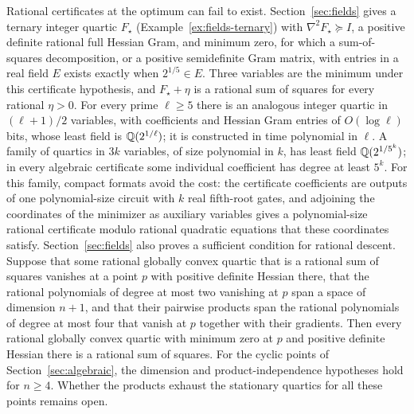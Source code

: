 Rational certificates at the optimum can fail to exist.
Section~\ref{sec:fields} gives a ternary integer quartic $F_\star$
(Example~\ref{ex:fields-ternary}) with $\nabla^2F_\star\succeq I$, a positive
definite rational full Hessian Gram, and minimum zero, for which a
sum-of-squares decomposition, or a positive semidefinite Gram matrix, with
entries in a real field $E$ exists exactly when $2^{1/5}\in E$. Three variables
are the minimum under this certificate hypothesis, and $F_\star+\eta$ is a
rational sum of squares for every rational $\eta>0$. For every prime $\ell\ge5$
there is an analogous integer quartic in $(\ell+1)/2$ variables, with
coefficients and Hessian Gram entries of $O(\log\ell)$ bits, whose least
field is $\mathbb Q(2^{1/\ell})$; it is constructed in time polynomial in $\ell$. A
family of quartics in $3k$ variables, of size polynomial in $k$, has least
field $\mathbb Q(2^{1/5^k})$; in every algebraic certificate some individual
coefficient has degree at least $5^k$. For this family, compact formats avoid
the cost: the certificate coefficients are outputs of one polynomial-size
circuit with $k$ real fifth-root gates, and adjoining the coordinates of the
minimizer as auxiliary variables gives a polynomial-size rational certificate
modulo rational quadratic equations that these coordinates satisfy.
Section~\ref{sec:fields} also proves a sufficient condition for rational
descent. Suppose that some rational globally convex quartic that is a rational
sum of squares vanishes at a point $p$ with positive definite Hessian there,
that the rational polynomials of degree at most two vanishing at $p$ span a
space of dimension $n+1$, and that their pairwise products span the rational
polynomials of degree at most four that vanish at $p$ together with their
gradients. Then every rational globally convex quartic with minimum zero at
$p$ and positive definite Hessian there is a rational sum of squares.
For the cyclic points of Section~\ref{sec:algebraic}, the dimension and
product-independence hypotheses hold for $n\ge4$. Whether the products
exhaust the stationary quartics for all these points remains open.

